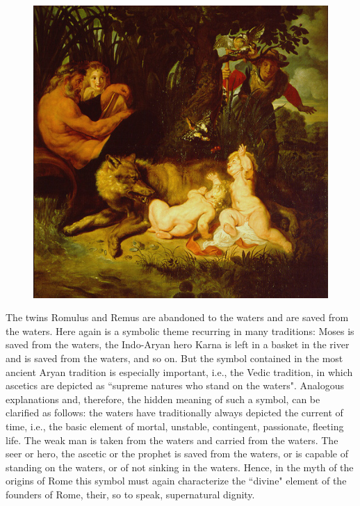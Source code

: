 \begin{figure}
 \includegraphics[scale=.3]{a20141211RaceandtheMythoftheOriginsofRome-img001.jpg} 
\end{figure}

The twins Romulus and Remus are abandoned to the waters and are saved from the waters. Here again is a symbolic theme recurring in many traditions: Moses is saved from the waters, the Indo-Aryan hero Karna is left in a basket in the river and is saved from the waters, and so on. But the symbol contained in the most ancient Aryan tradition is especially important, i.e., the Vedic tradition, in which ascetics are depicted as ``supreme natures who stand on the waters". Analogous explanations and, therefore, the hidden meaning of such a symbol, can be clarified as follows: the waters have traditionally always depicted the current of time, i.e., the basic element of mortal, unstable, contingent, passionate, fleeting life. The weak man is taken from the waters and carried from the waters. The seer or hero, the ascetic or the prophet is saved from the waters, or is capable of standing on the waters, or of not sinking in the waters. Hence, in the myth of the origins of Rome this symbol must again characterize the ``divine" element of the founders of Rome, their, so to speak, supernatural dignity.



